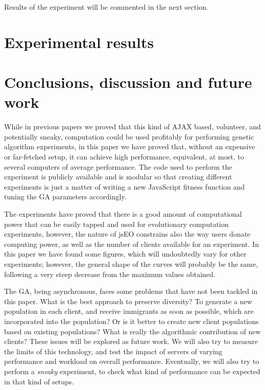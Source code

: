 \documentclass{llncs}
\begin{document}
Results of the experiment will be commented in the next section.

\section{Experimental results}
\label{sec:exp}


\section{Conclusions, discussion and future work}
\label{sec:conc}

While in previous papers  we proved that
this kind of AJAX based, volunteer, and potentially sneaky,
computation could be used profitably for performing genetic algorithm
experiments, in this paper we have proved that, 
without an expensive or far-fetched setup, it can achieve high
performance, equivalent, at most, to several computers of average
performance. The code used to perform the experiment is publicly
available and is modular so that creating different experiments is
just a matter of writing a new JavaScript fitness function and tuning
the GA parameters accordingly. 

The experiments have proved that there is a good amount of
computational power that can be easily tapped and used for
evolutionary computation experiments, however, the nature of jsEO
constrains also the way users donate computing power, as well as the
number of clients available for an experiment. In this paper we have
found some figures, which will undoubtedly vary for other experiments;
however, the general shape of the curves will probably be the same,
following a very steep decrease from the maximum values obtained. 

The GA, being asynchronous, faces some problems that have not been
tackled in this paper. What is the best approach to preserve
diversity? To generate a new population in each client, and receive
immigrants as soon as possible, which are incorporated into the
population? Or is it better to create new client populations based on
existing populations? What is really the algorithmic contribution of
new clients? These issues will be explored as future work. 
We will also try to measure the limits of this technology, and test
the impact of servers of varying performance and workload on overall
performance. Eventually, we will also try to perform a {\em sneaky}
experiment, to check what kind of performance can be expected in that
kind of setups. 
\end{document}
